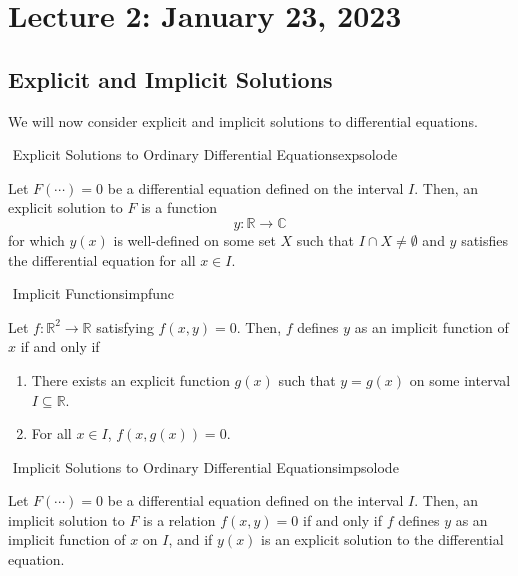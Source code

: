 \section{Lecture 2: January 23, 2023}

    \subsection{Explicit and Implicit Solutions}

        We will now consider explicit and implicit solutions to differential equations.
        \begin{definition}{\Stop\,\,Explicit Solutions to Ordinary Differential Equations}{expsolode}
            
            Let \(F(\cdots)=0\) be a differential equation defined on the interval \(I\). Then, an explicit solution to \(F\) is a function
            \begin{equation*}
                y:\mathbb{R}\to\mathbb{C}
            \end{equation*}
            for which \(y(x)\) is well-defined on some set \(X\) such that \(I\cap X\neq\emptyset\) and \(y\) satisfies the differential equation for all \(x \in I\).

        \end{definition}
        \begin{definition}{\Stop\,\,Implicit Functions}{impfunc}

            Let \(f:\mathbb{R}^2\to\mathbb{R}\) satisfying \(f(x,y)=0\). Then, \(f\) defines \(y\) as an implicit function of \(x\) if and only if
            \begin{enumerate}
                \item There exists an explicit function \(g(x)\) such that \(y=g(x)\) on some interval \(I\subseteq \mathbb{R}\).
                \item For all \(x\in I\), \(f(x,g(x))=0\).
            \end{enumerate}
            
        \end{definition}
        \begin{definition}{\Stop\,\,Implicit Solutions to Ordinary Differential Equations}{impsolode}
            
            Let \(F(\cdots)=0\) be a differential equation defined on the interval \(I\). Then, an implicit solution to \(F\) is a relation \(f(x,y)=0\) if and only if \(f\) defines \(y\) as an implicit function of \(x\) on \(I\), and if \(y(x)\) is an explicit solution to the differential equation.

        \end{definition}
